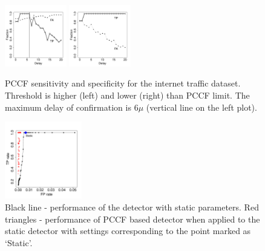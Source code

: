 \begin{figure}[htb!]
\centering
\includegraphics[width=0.24\textwidth]{articles/pics/sdm_paper/performance1sdm.pdf}
\includegraphics[width=0.24\textwidth]{articles/pics/sdm_paper/performance2sdm.pdf}
\caption{
PCCF sensitivity and specificity for the internet traffic dataset.
Threshold is higher (left) and lower (right) than PCCF limit.
The maximum delay of confirmation is $6 \mu $ (vertical line on the left plot).
}
\label{fig:fractraffic}
\end{figure}
%
\begin{figure}[htb!]
\centering
\includegraphics[width=0.3\textwidth]{articles/pics/sdm_paper/ROCimprtraff.pdf}
\caption{
	Black line - performance of the detector with static parameters.
	Red triangles - performance of PCCF based detector when applied to the  static detector with settings corresponding to the point marked as `Static'.
}
\label{fig:rocdynamictraffic}
\end{figure}

